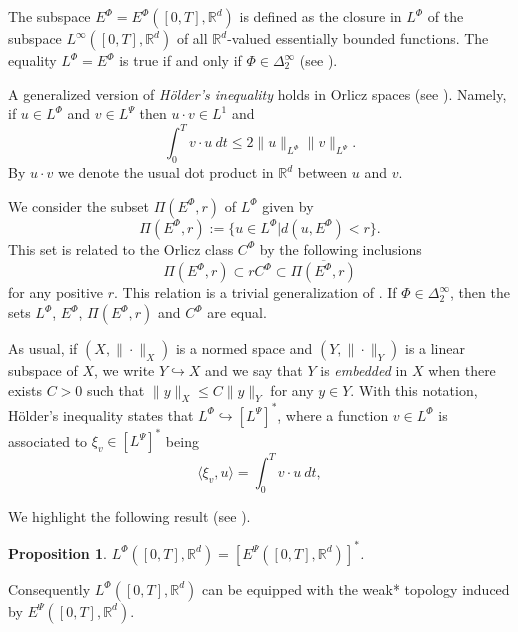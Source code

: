 \documentclass[twoside]{article}
\newtheorem{prop}[thm]{Proposition}
\theoremstyle{remark}
\newcommand{\orlnor}{\|_{L^{\Phi}}}
\newcommand{\lphi}{L^{\Phi}}
\newcommand{\lpsi}{L^{\Psi}}
\newcommand{\ephi}{E^{\Phi}}
\newcommand{\claseor}{C^{\Phi}}
\newcommand{\rr}{\mathbb{R}}
\renewcommand{\leq}{\leqslant}
\newcommand{\epsi}{E^{\Psi}}
\begin{document}
The subspace $\ephi=\ephi\left([0,T],\rr^d\right)$ is defined as the closure in $\lphi$ of the subspace $L^{\infty}\left([0,T],\rr^d\right)$ of all $\mathbb{R}^d$-valued essentially bounded functions. The equality $\lphi=\ephi$ is true if and only if $\Phi\in\Delta_2^{\infty}$ (see \cite[Cor. 5.1]{Orliczvectorial2005}). 

A generalized version of \emph{H\"older's inequality} holds in Orlicz spaces (see \cite[Thm. 7.2]{Orliczvectorial2005}). Namely, if $u\in\lphi$ and $v\in\lpsi$ then $u\cdot v\in L^1$ and
\begin{equation}\label{holder}
\int_0^Tv\cdot u\ dt\leq 2 \|u\orlnor\|v\|_{L^{\Psi}}.
\end{equation}
By $u\cdot v$ we denote the usual dot product in $\mathbb{R}^{d}$ between $u$ and $v$.

We consider the subset $\Pi(\ephi,r)$ of $\lphi$ given by
\[\Pi(\ephi,r):=\{u\in\lphi| d(u,\ephi)<r\}.\]
This set is related to the Orlicz class $\claseor$ by the following inclusions
\begin{equation}\label{eq:inclusiones}\Pi(\ephi, r )\subset r \claseor\subset\overline{\Pi(\ephi,r)}
\end{equation}
for any positive $r$. This relation is a trivial generalization of  \cite[Thm. 5.6]{Orliczvectorial2005}.
If $\Phi \in \Delta_2^{\infty}$,  then the sets $\lphi$, $\ephi$, $\Pi(\ephi,r)$ and $\claseor$ are equal.
 
As usual, if $(X,\|\cdot\|_X)$ is a normed space and $(Y,\|\cdot \|_Y)$ is a linear subspace of $X$,  we write $Y\hookrightarrow X$ and we say that $Y$ is \emph{embedded} in $X$  when there exists $C>0$ such that
$\|y\|_X\leq C\|y\|_Y$ for any $y\in Y$.  With this notation, H\"older's inequality states that  $\lphi\hookrightarrow  \left[\lpsi\right]^*$, where a function $v\in\lphi$ is associated  to $\xi_v\in \left[\lpsi\right]^*$ being
\begin{equation}\label{pairing}
  \langle \xi_v,u\rangle=\int_0^Tv\cdot u\ dt,
\end{equation}

We highlight the following result (see \cite[Th. 3.3]{gwiazda2013anisotropic}).

\begin{prop} $\lphi\left([0,T],\rr^d\right)=\left[\epsi\left([0,T],\rr^d\right)\right]^*$.
 
\end{prop}

Consequently  $\lphi\left([0,T],\rr^d\right)$ can be equipped with the weak* topology induced by $\epsi\left([0,T],\rr^d\right)$.
\end{document}
